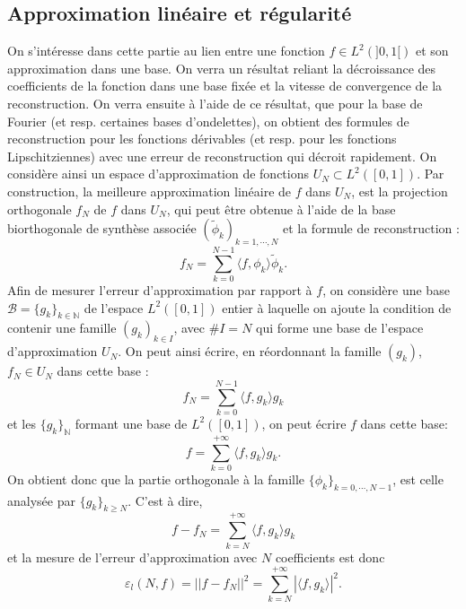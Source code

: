\subsection{Approximation linéaire et régularité}
On s'intéresse dans cette partie au lien entre une fonction $f\in L^2(]0, 1[)$ et son approximation dans une base. On verra un résultat reliant la décroissance des coefficients de la fonction dans une base fixée et la vitesse de convergence de la reconstruction. 
On verra ensuite à l'aide de ce résultat, que pour la base de Fourier (et resp. certaines bases d'ondelettes), on obtient des formules de reconstruction pour les fonctions dérivables (et resp. pour les fonctions Lipschitziennes) avec une erreur de reconstruction qui décroit rapidement.
\newline 
On considère ainsi un espace d'approximation de fonctions $U_N \subset L^2([0, 1])$.
Par construction, la meilleure approximation linéaire de $f$ dans $U_N$, est la projection orthogonale $f_N$ de $f$ dans $U_N$, qui peut être obtenue à l'aide de la base biorthogonale de synthèse associée $(\tilde{\phi}_k)_{k=1, \cdots, N}$ et la formule de reconstruction :
\begin{equation}
	f_N = \sum_{k=0}^{N-1}\langle f, \phi_k \rangle \tilde{\phi}_k.
\end{equation}
Afin de mesurer l'erreur d'approximation par rapport à $f$, on considère une base $\mathcal{B} = \{g_k\}_{k\in \mathbb{N}}$ de l'espace $L^2([0, 1])$ entier à laquelle on ajoute la condition de contenir une famille $(g_k)_{k\in I}$, avec $\#I = N$ qui forme une base de l'espace d'approximation $U_N$.
On peut ainsi écrire, en réordonnant la famille $(g_k)$,  $f_N \in U_N$ dans cette base :
\begin{equation}
	f_N = \sum_{k=0}^{N-1} \langle f, g_k \rangle g_k 
\end{equation}
et les $\{g_k\}_{\mathbb{N}}$ formant une base de $L^2([0, 1])$, on peut écrire $f$ dans cette base:
\begin{equation}
	f = \sum_{k=0}^{+\infty} \langle f, g_k \rangle g_k.
\end{equation}
On obtient donc que la partie orthogonale à la famille $\{\phi_k\}_{k=0, \cdots, N-1}$, est celle analysée par $\{g_k\}_{k\geq N}$.
C'est à dire, 
\begin{equation}
	f - f_N = \sum_{k=N}^{+\infty} \langle f, g_k \rangle g_k 
\end{equation}
et la mesure de l'erreur d'approximation avec $N$ coefficients est donc 
\begin{equation}
	\varepsilon_l(N, f) = ||f-f_N||^2 = \sum_{k=N}^{+\infty} |\langle f, g_k\rangle|^2.
\end{equation}
